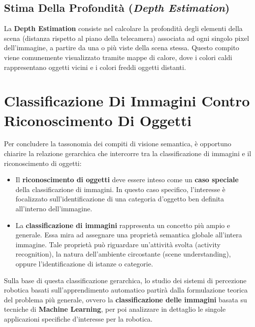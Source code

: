 ﻿\documentclass[11pt, a4paper]{article}
\begin{document}

\subsection{Stima Della Profondità (\emph{Depth Estimation})}

La \textbf{Depth Estimation} consiste nel calcolare la profondità degli elementi della scena (distanza rispetto al piano della telecamera) associata ad ogni singolo pixel dell'immagine, a partire da una o più viste della scena stessa. Questo compito viene comunemente visualizzato tramite mappe di calore, dove i colori caldi rappresentano oggetti vicini e i colori freddi oggetti distanti.


\newpage

\section{Classificazione Di Immagini Contro Riconoscimento Di Oggetti}

Per concludere la tassonomia dei compiti di visione semantica, è opportuno chiarire la relazione gerarchica che intercorre tra la classificazione di immagini e il riconoscimento di oggetti:

\begin{itemize}
    \item Il \textbf{riconoscimento di oggetti} deve essere inteso come un \textbf{caso speciale} della classificazione di immagini. In questo caso specifico, l'interesse è focalizzato sull'identificazione di una categoria d'oggetto ben definita all'interno dell'immagine.
    \item La \textbf{classificazione di immagini} rappresenta un concetto più ampio e generale. Essa mira ad assegnare una proprietà semantica globale all'intera immagine. Tale proprietà può riguardare un'attività svolta (activity recognition), la natura dell'ambiente circostante (scene understanding), oppure l'identificazione di istanze o categorie.
\end{itemize}

Sulla base di questa classificazione gerarchica, lo studio dei sistemi di percezione robotica basati sull'apprendimento automatico partirà dalla formulazione teorica del problema più generale, ovvero la \textbf{classificazione delle immagini} basata su tecniche di \textbf{Machine Learning}, per poi analizzare in dettaglio le singole applicazioni specifiche d'interesse per la robotica.
\end{document}

